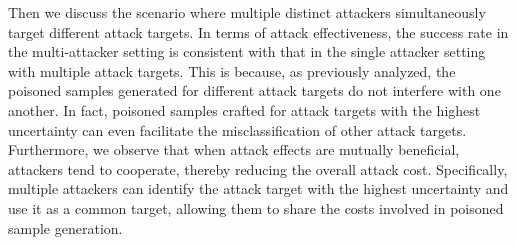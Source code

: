 \documentclass[lettersize,journal]{IEEEtran}
\begin{document}
Then we discuss the scenario where multiple distinct attackers simultaneously target different attack targets.
In terms of attack effectiveness, the success rate in the multi-attacker setting is consistent with that in the single attacker setting with multiple attack targets.
This is because, as previously analyzed, the poisoned samples generated for different attack targets do not interfere with one another.
In fact, poisoned samples crafted for attack targets with the highest uncertainty can even facilitate the misclassification of other attack targets.
Furthermore, we observe that when attack effects are mutually beneficial, attackers tend to cooperate, thereby reducing the overall attack cost. Specifically, multiple attackers can identify the attack target with the highest uncertainty and use it as a common target, allowing them to share the costs involved in poisoned sample generation.
\begin{table}[h!]
	\caption{Multi-Target Attack across Four Ddatasets}
	\label{tab: asz }
	\setlength{\tabcolsep}{5.8pt}
	\begin{center}
	\end{center}
\end{table}
\end{document}
